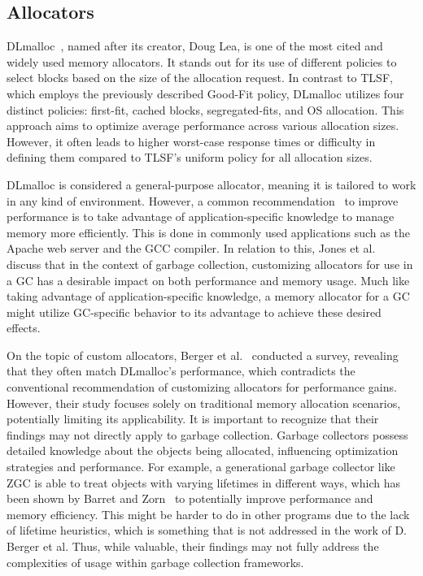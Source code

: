 
\subsection{Allocators}

DLmalloc~\cite{dlmalloc}, named after its creator, Doug Lea, is one of the most cited and widely used memory allocators. It stands out for its use of different policies to select blocks based on the size of the allocation request. In contrast to TLSF, which employs the previously described Good-Fit policy, DLmalloc utilizes four distinct policies: first-fit, cached blocks, segregated-fits, and OS allocation. This approach aims to optimize average performance across various allocation sizes. However, it often leads to higher worst-case response times or difficulty in defining them compared to TLSF's uniform policy for all allocation sizes.

DLmalloc is considered a general-purpose allocator, meaning it is tailored to work in any kind of environment. However, a common recommendation~\cite{custom_rec_1, custom_rec_2} to improve performance is to take advantage of application-specific knowledge to manage memory more efficiently. This is done in commonly used applications such as the Apache web server and the GCC compiler. In relation to this, Jones et al.~\cite{gchandbook} discuss that in the context of garbage collection, customizing allocators for use in a GC has a desirable impact on both performance and memory usage. Much like taking advantage of application-specific knowledge, a memory allocator for a GC might utilize GC-specific behavior to its advantage to achieve these desired effects.

On the topic of custom allocators, Berger et al.~\cite{slow_custom_allocators} conducted a survey, revealing that they often match DLmalloc's performance, which contradicts the conventional recommendation of customizing allocators for performance gains. However, their study focuses solely on traditional memory allocation scenarios, potentially limiting its applicability. It is important to recognize that their findings may not directly apply to garbage collection. Garbage collectors possess detailed knowledge about the objects being allocated, influencing optimization strategies and performance. For example, a generational garbage collector like ZGC is able to treat objects with varying lifetimes in different ways, which has been shown by Barret and Zorn~\cite{lifetime_predictors_memalloc} to potentially improve performance and memory efficiency. This might be harder to do in other programs due to the lack of lifetime heuristics, which is something that is not addressed in the work of D. Berger et al. Thus, while valuable, their findings may not fully address the complexities of usage within garbage collection frameworks.

